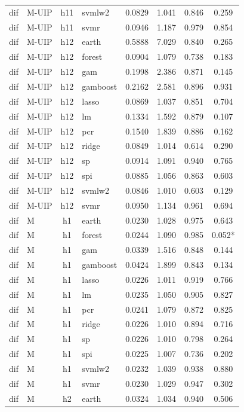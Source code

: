 \begin{ThreePartTable}
\begin{longtable}[t]{llclcccc}
dif & M-UIP & h11 & svmlw2 & 0.0829 & 1.041 & 0.846 & 0.259\\
dif & M-UIP & h11 & svmr & 0.0946 & 1.187 & 0.979 & 0.854\\
\addlinespace
dif & M-UIP & h12 & earth & 0.5888 & 7.029 & 0.840 & 0.265\\
dif & M-UIP & h12 & forest & 0.0904 & 1.079 & 0.738 & 0.183\\
dif & M-UIP & h12 & gam & 0.1998 & 2.386 & 0.871 & 0.145\\
dif & M-UIP & h12 & gamboost & 0.2162 & 2.581 & 0.896 & 0.931\\
dif & M-UIP & h12 & lasso & 0.0869 & 1.037 & 0.851 & 0.704\\
dif & M-UIP & h12 & lm & 0.1334 & 1.592 & 0.879 & 0.107\\
dif & M-UIP & h12 & pcr & 0.1540 & 1.839 & 0.886 & 0.162\\
dif & M-UIP & h12 & ridge & 0.0849 & 1.014 & 0.614 & 0.290\\
dif & M-UIP & h12 & sp & 0.0914 & 1.091 & 0.940 & 0.765\\
dif & M-UIP & h12 & spi & 0.0885 & 1.056 & 0.863 & 0.603\\
dif & M-UIP & h12 & svmlw2 & 0.0846 & 1.010 & 0.603 & 0.129\\
dif & M-UIP & h12 & svmr & 0.0950 & 1.134 & 0.961 & 0.694\\
\addlinespace
dif & M & h1 & earth & 0.0230 & 1.028 & 0.975 & 0.643\\
dif & M & h1 & forest & 0.0244 & 1.090 & 0.985 & 0.052*\\
dif & M & h1 & gam & 0.0339 & 1.516 & 0.848 & 0.144\\
dif & M & h1 & gamboost & 0.0424 & 1.899 & 0.843 & 0.134\\
dif & M & h1 & lasso & 0.0226 & 1.011 & 0.919 & 0.766\\
dif & M & h1 & lm & 0.0235 & 1.050 & 0.905 & 0.827\\
dif & M & h1 & pcr & 0.0241 & 1.079 & 0.872 & 0.825\\
dif & M & h1 & ridge & 0.0226 & 1.010 & 0.894 & 0.716\\
dif & M & h1 & sp & 0.0226 & 1.010 & 0.798 & 0.264\\
dif & M & h1 & spi & 0.0225 & 1.007 & 0.736 & 0.202\\
dif & M & h1 & svmlw2 & 0.0232 & 1.039 & 0.938 & 0.880\\
dif & M & h1 & svmr & 0.0230 & 1.029 & 0.947 & 0.302\\
\addlinespace
dif & M & h2 & earth & 0.0324 & 1.034 & 0.940 & 0.506\\

\end{longtable}
\end{ThreePartTable}

